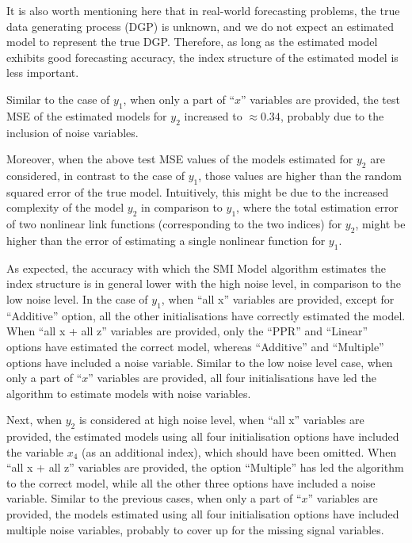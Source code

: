 \documentclass[11pt,a4paper,]{article}
\begin{document}
It is also worth mentioning here that in real-world forecasting
problems, the true data generating process (DGP) is unknown, and we do
not expect an estimated model to represent the true DGP. Therefore, as
long as the estimated model exhibits good forecasting accuracy, the
index structure of the estimated model is less important.

Similar to the case of \(y_{1}\), when only a part of ``\(x\)''
variables are provided, the test MSE of the estimated models for
\(y_{2}\) increased to \(\approx 0.34\), probably due to the inclusion
of noise variables.

Moreover, when the above test MSE values of the models estimated for
\(y_{2}\) are considered, in contrast to the case of \(y_{1}\), those
values are higher than the random squared error of the true model.
Intuitively, this might be due to the increased complexity of the model
\(y_{2}\) in comparison to \(y_{1}\), where the total estimation error
of two nonlinear link functions (corresponding to the two indices) for
\(y_{2}\), might be higher than the error of estimating a single
nonlinear function for \(y_{1}\).

As expected, the accuracy with which the SMI Model algorithm estimates
the index structure is in general lower with the high noise level, in
comparison to the low noise level. In the case of \(y_{1}\), when ``all
x'' variables are provided, except for ``Additive'' option, all the
other initialisations have correctly estimated the model. When ``all x +
all z'' variables are provided, only the ``PPR'' and ``Linear'' options
have estimated the correct model, whereas ``Additive'' and ``Multiple''
options have included a noise variable. Similar to the low noise level
case, when only a part of ``\(x\)'' variables are provided, all four
initialisations have led the algorithm to estimate models with noise
variables.

Next, when \(y_{2}\) is considered at high noise level, when ``all x''
variables are provided, the estimated models using all four
initialisation options have included the variable \(x_{4}\) (as an
additional index), which should have been omitted. When ``all x + all
z'' variables are provided, the option ``Multiple'' has led the
algorithm to the correct model, while all the other three options have
included a noise variable. Similar to the previous cases, when only a
part of ``\(x\)'' variables are provided, the models estimated using all
four initialisation options have included multiple noise variables,
probably to cover up for the missing signal variables.
\end{document}
